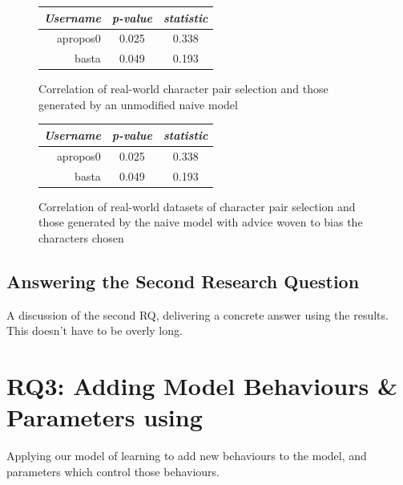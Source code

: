\begin{figure}[h]
  \centering
  
  \begin{minipage}{.45\textwidth}
    \centering
    \begin{tabular}{r|c|c}
      \emph{Username} & \emph{p-value} & \emph{\tau{} statistic} \\\hline\hline
      apropos0 & 0.025 & 0.338 \\
      basta & 0.049 & 0.193 \\
    \end{tabular}
    \caption{Correlation of real-world character pair selection and those generated by an unmodified naive model}
    \label{prior_distribution_results_table_comparison_to_real_world_datasets}
  \end{minipage}\hfill
  \begin{minipage}{.45\textwidth}
    \centering
    \begin{tabular}{r|c|c}
      \emph{Username} & \emph{p-value} & \emph{\tau{} statistic} \\\hline\hline
      apropos0 & 0.025 & 0.338 \\
      basta & 0.049 & 0.193 \\
    \end{tabular}
    \caption{Correlation of real-world datasets of character pair selection and those generated by the naive model with advice woven to bias the characters chosen}
    \label{prior_distribution_results_table_comparison_to_real_world_datasets}
  \end{minipage}

\end{figure}




\subsection{Answering the Second Research Question}

A discussion of the second RQ, delivering a concrete answer using the results.
This doesn't have to be overly long.



\section{RQ3: Adding Model Behaviours \& Parameters using \AspectOrientation}
\label{rq3_results}

Applying our model of learning to add new behaviours to the model, and
parameters which control those behaviours.

